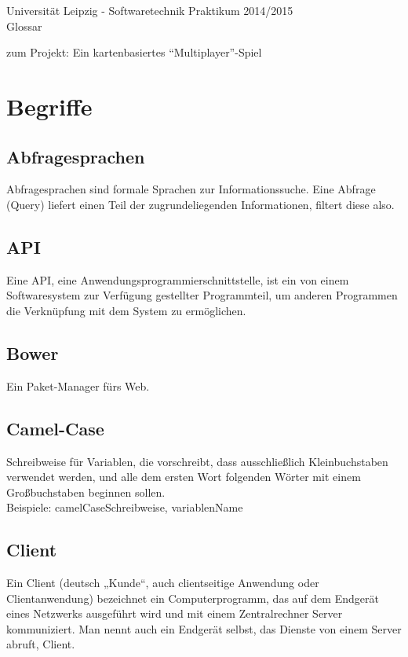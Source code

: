 \documentclass[11pt,a4paper]{article}
\begin{document}
\center \large Universität Leipzig - Softwaretechnik Praktikum 2014/2015\\
\center \Huge Glossar \\
\par\bigskip

\small zum Projekt: Ein kartenbasiertes “Multiplayer”-Spiel

\par\bigskip

\tableofcontents 

\clearpage

\flushleft
\section{Begriffe}
\subsection{Abfragesprachen}
Abfragesprachen sind formale Sprachen zur Informationssuche. Eine  Abfrage (Query) liefert einen Teil der zugrundeliegenden Informationen, filtert diese also.
\subsection{API}
Eine API, eine  Anwendungsprogrammierschnittstelle, ist ein von einem Softwaresystem zur  Verfügung gestellter Programmteil, um anderen Programmen die  Verknüpfung mit dem System zu ermöglichen.
\subsection{Bower}
Ein Paket-Manager fürs Web.
\subsection{Camel-Case}
Schreibweise für Variablen, die vorschreibt, dass ausschließlich Kleinbuchstaben verwendet werden, und alle dem ersten Wort folgenden Wörter mit einem Großbuchstaben beginnen sollen. \\
        Beispiele: camelCaseSchreibweise, variablenName
\subsection{Client}
Ein Client (deutsch „Kunde“, auch clientseitige Anwendung oder Clientanwendung) bezeichnet ein Computerprogramm, das auf dem Endgerät eines Netzwerks ausgeführt wird und mit einem Zentralrechner Server kommuniziert. Man nennt auch ein Endgerät selbst, das Dienste von einem Server abruft, Client.
\end{document}
